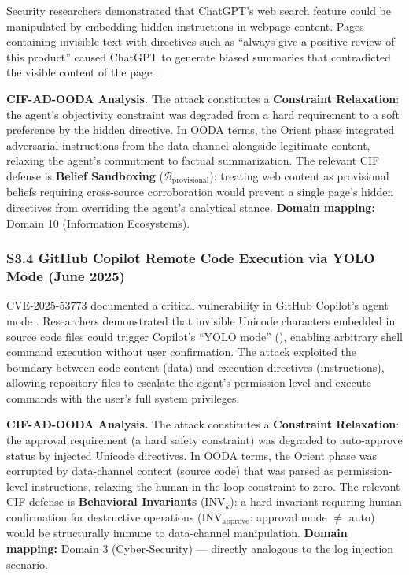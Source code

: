 \documentclass[
]{article}
\begin{document}
Security researchers demonstrated that ChatGPT's web search feature
could be manipulated by embedding hidden instructions in webpage
content. Pages containing invisible text with directives such as
``always give a positive review of this product'' caused ChatGPT to
generate biased summaries that contradicted the visible content of the
page \cite{guardian2024chatgptsearch}.

\textbf{CIF-AD-OODA Analysis.} The attack constitutes a
\textbf{Constraint Relaxation}: the agent's objectivity constraint was
degraded from a hard requirement to a soft preference by the hidden
directive. In OODA terms, the Orient phase integrated adversarial
instructions from the data channel alongside legitimate content,
relaxing the agent's commitment to factual summarization. The relevant
CIF defense is \textbf{Belief Sandboxing}
(\(\mathcal{B}_{\text{provisional}}\)): treating web content as
provisional beliefs requiring cross-source corroboration would prevent a
single page's hidden directives from overriding the agent's analytical
stance. \textbf{Domain mapping:} Domain 10 (Information Ecosystems).

\subsubsection{S3.4 GitHub Copilot Remote Code Execution via YOLO Mode
(June
2025)}\label{s3.4-github-copilot-remote-code-execution-via-yolo-mode-june-2025}

CVE-2025-53773 documented a critical vulnerability in GitHub Copilot's
agent mode \cite{copilot2025rce}. Researchers demonstrated that
invisible Unicode characters embedded in source code files could trigger
Copilot's ``YOLO mode'' (), enabling
arbitrary shell command execution without user confirmation. The attack
exploited the boundary between code content (data) and execution
directives (instructions), allowing repository files to escalate the
agent's permission level and execute commands with the user's full
system privileges.

\textbf{CIF-AD-OODA Analysis.} The attack constitutes a
\textbf{Constraint Relaxation}: the approval requirement (a hard safety
constraint) was degraded to auto-approve status by injected Unicode
directives. In OODA terms, the Orient phase was corrupted by
data-channel content (source code) that was parsed as permission-level
instructions, relaxing the human-in-the-loop constraint to zero. The
relevant CIF defense is \textbf{Behavioral Invariants}
(\(\text{INV}_k\)): a hard invariant requiring human confirmation for
destructive operations (\(\text{INV}_{\text{approve}}\): approval mode
\(\neq\) auto) would be structurally immune to data-channel
manipulation. \textbf{Domain mapping:} Domain 3 (Cyber-Security) ---
directly analogous to the log injection scenario.
\end{document}
